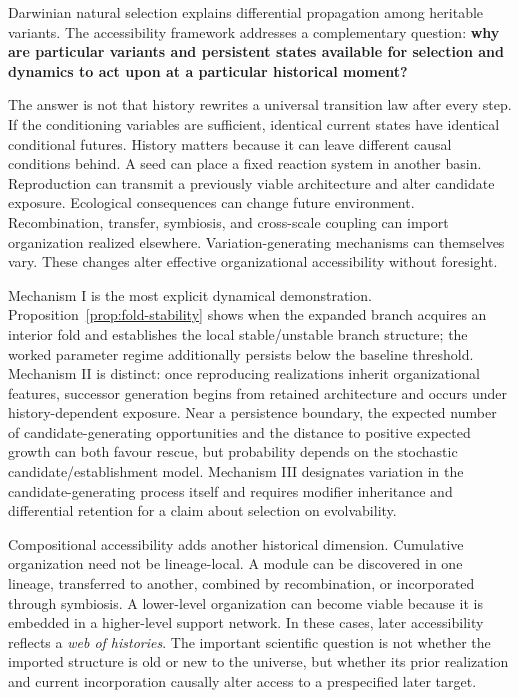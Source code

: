 \documentclass[11pt,a4paper]{article}
\begin{document}
Darwinian natural selection explains differential propagation among heritable variants. The accessibility framework addresses a complementary question: \textbf{why are particular variants and persistent states available for selection and dynamics to act upon at a particular historical moment?}

The answer is not that history rewrites a universal transition law after every step. If the conditioning variables are sufficient, identical current states have identical conditional futures. History matters because it can leave different causal conditions behind. A seed can place a fixed reaction system in another basin. Reproduction can transmit a previously viable architecture and alter candidate exposure. Ecological consequences can change future environment. Recombination, transfer, symbiosis, and cross-scale coupling can import organization realized elsewhere. Variation-generating mechanisms can themselves vary. These changes alter effective organizational accessibility without foresight.

Mechanism I is the most explicit dynamical demonstration. Proposition~\ref{prop:fold-stability} shows when the expanded branch acquires an interior fold and establishes the local stable/unstable branch structure; the worked parameter regime additionally persists below the baseline threshold. Mechanism II is distinct: once reproducing realizations inherit organizational features, successor generation begins from retained architecture and occurs under history-dependent exposure. Near a persistence boundary, the expected number of candidate-generating opportunities and the distance to positive expected growth can both favour rescue, but probability depends on the stochastic candidate/establishment model. Mechanism III designates variation in the candidate-generating process itself and requires modifier inheritance and differential retention for a claim about selection on evolvability.

Compositional accessibility adds another historical dimension. Cumulative organization need not be lineage-local. A module can be discovered in one lineage, transferred to another, combined by recombination, or incorporated through symbiosis. A lower-level organization can become viable because it is embedded in a higher-level support network. In these cases, later accessibility reflects a \emph{web of histories}. The important scientific question is not whether the imported structure is old or new to the universe, but whether its prior realization and current incorporation causally alter access to a prespecified later target.
\end{document}
